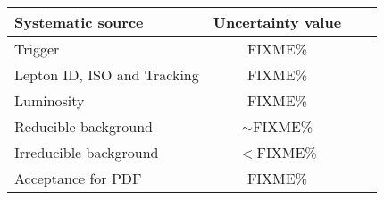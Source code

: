 \begin{table*}[htbH]
\begin{center}
\begin{tabular}{lclc}
\hline Systematic source & Uncertainty value\\
\hline Trigger & FIXME\%  \\
Lepton ID, ISO and Tracking & FIXME\%\\
Luminosity & FIXME\%\\
Reducible background & $\sim$FIXME\%\\
Irreducible background & $<$FIXME\%\\
Acceptance for PDF & FIXME\%\\
\hline
\end{tabular}
\end{center}
\end{table*}


